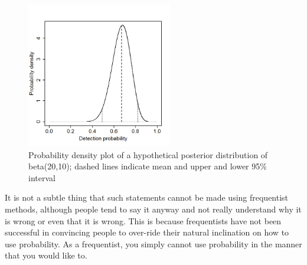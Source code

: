 \begin{figure}
\begin{center}
\includegraphics[height=2.5in]{Ch2-Bayes/figs/densityvsdetection}
\end{center}
\caption{Probability density plot of a hypothetical
 posterior distribution of beta(20,10); dashed lines 
 indicate mean and upper and lower 95\% interval}
\label{densityvsdetection.fig}
\end{figure}

It is not a subtle thing that such statements 
cannot be made using frequentist methods, although people tend to say
it anyway and not really understand why it is wrong or even that it is
wrong. This is  because %
frequentists have not been successful in convincing people to
over-ride their natural inclination on how to use probability.  As a
frequentist, you simply cannot use probability in the manner that you
would like to.


